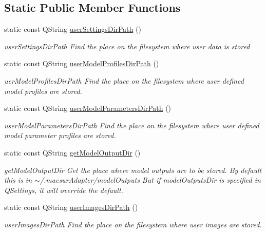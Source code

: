 \subsection*{Static Public Member Functions}
\begin{DoxyCompactItemize}
\item 
static const Q\-String \hyperlink{class_mad_utils_a615810cd3a1f9894731a51c5f9cc3e69}{user\-Settings\-Dir\-Path} ()
\begin{DoxyCompactList}\small\item\em user\-Settings\-Dir\-Path Find the place on the filesystem where user data is stored \end{DoxyCompactList}\item 
static const Q\-String \hyperlink{class_mad_utils_aeaed9eea3735e2fa84059b1cd73c9bdd}{user\-Model\-Profiles\-Dir\-Path} ()
\begin{DoxyCompactList}\small\item\em uer\-Model\-Profiles\-Dir\-Path Find the place on the filesystem where user defined model profiles are stored. \end{DoxyCompactList}\item 
static const Q\-String \hyperlink{class_mad_utils_ac79920c4e62df9e73cdc7f5c7675d93f}{user\-Model\-Parameters\-Dir\-Path} ()
\begin{DoxyCompactList}\small\item\em user\-Model\-Parameters\-Dir\-Path Find the place on the filesystem where user defined model parameter profiles are stored. \end{DoxyCompactList}\item 
static const Q\-String \hyperlink{class_mad_utils_a027a1b9a97c1eb82539af3ea971ca73f}{get\-Model\-Output\-Dir} ()
\begin{DoxyCompactList}\small\item\em get\-Model\-Output\-Dir Get the place where model outputs are to be stored. By default this is in $\sim$/.macsur\-Adapter/model\-Outputs But if model\-Outputs\-Dir is specified in Q\-Settings, it will override the default. \end{DoxyCompactList}\item 
static const Q\-String \hyperlink{class_mad_utils_a76f1053d29df630d965a41830920257a}{user\-Images\-Dir\-Path} ()
\begin{DoxyCompactList}\small\item\em user\-Images\-Dir\-Path Find the place on the filesystem where user images are stored. \end{DoxyCompactList}\item 

\end{DoxyCompactItemize}
